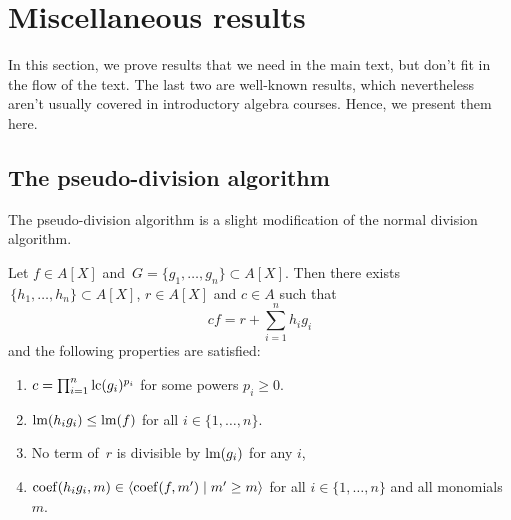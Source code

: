\section{Miscellaneous results}
In this section, we prove results that we need in the main text, but don't fit in the flow of the text. The last two are well-known results, which nevertheless aren't usually covered in introductory algebra courses. Hence, we present them here.

\subsection{The pseudo-division algorithm}\label{app:pseudo}
The pseudo-division algorithm is a slight modification of the normal division algorithm.

\begin{theorem}
  Let $f \in A[X]$ and $\,G = \{g_{1}, \dots, g_{n}\} \subset A[X]$. Then there exists $\,\{h_{1}, \dots, h_{n}\} \subset A[X]$, $r \in A[X]$ and $c \in A$ such that
  \[c f = r + \sum_{i=1}^{n} h_{i} g_{i}\]
  and the following properties are satisfied:
  \begin{enumerate}
    \item $c = \prod_{i=1}^{n} \operatorname{lc}(g_{i})^{p_{i}}$ for some powers $p_{i} \geq 0$.
    \item $\operatorname{lm}(h_{i} g_{i}) \leq \operatorname{lm}(f)$ for all $i \in \{1, \dots, n\}$.
    \item No term of $\,r$ is divisible by $\operatorname{lm}(g_{i})$ for any $i$,
    \item $\operatorname{coef}(h_{i} g_{i}, m) \in \langle \operatorname{coef}(f, m') \mid m' \geq m \rangle$ for all $i \in \{1, \dots, n\}$ and all monomials $m$.
  \end{enumerate}
\end{theorem}
